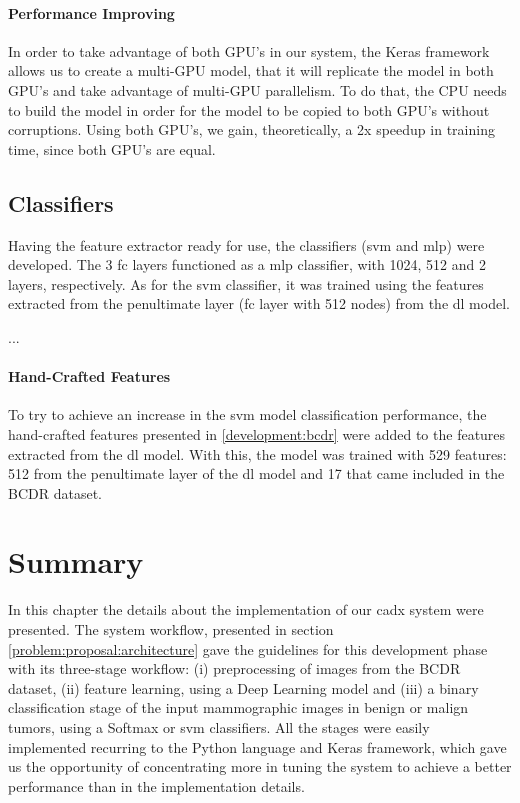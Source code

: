 \documentclass[
  twoside,
  11pt, a4paper,
  footinclude=true,
  headinclude=true,
  cleardoublepage=empty
]{scrbook}
\begin{document}
        \paragraph{Performance Improving}
          In order to take advantage of both GPU's in our system, the Keras framework allows us to create a multi-GPU model, that it will replicate the model in both GPU's and take advantage of multi-GPU parallelism. To do that, the CPU needs to build the model in order for the model to be copied to both GPU's without corruptions. Using both GPU's, we gain, theoretically, a 2x speedup in training time, since both GPU's are equal.

      \subsection{Classifiers}
        Having the feature extractor ready for use, the classifiers (\gls{svm} and \gls{mlp}) were developed. The 3 \gls{fc} layers functioned as a \gls{mlp} classifier, with 1024, 512 and 2 layers, respectively. As for the \gls{svm} classifier, it was trained using the features extracted from the penultimate layer (\gls{fc} layer with 512 nodes) from the \gls{dl} model.

        ...

        \paragraph{Hand-Crafted Features}
          To try to achieve an increase in the \gls{svm} model classification performance, the hand-crafted features presented in \ref{development:bcdr} were added to the features extracted from the \gls{dl} model. With this, the model was trained with 529 features: 512 from the penultimate layer of the \gls{dl} model and 17 that came included in the BCDR dataset.

    \section{Summary} \label{development:summary}
      In this chapter the details about the implementation of our \gls{cadx} system were presented. The system workflow, presented in section \ref{problem:proposal:architecture} gave the guidelines for this development phase with its three-stage workflow: (i) preprocessing of images from the BCDR dataset, (ii) feature learning, using a Deep Learning model and (iii) a binary classification stage of the input mammographic images in benign or malign tumors, using a Softmax or \gls{svm} classifiers. All the stages were easily implemented recurring to the Python language and Keras framework, which gave us the opportunity of concentrating more in tuning the system to achieve a better performance than in the implementation details.
\end{document}
